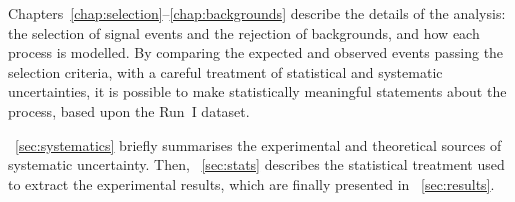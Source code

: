 
Chapters~\ref{chap:selection}--\ref{chap:backgrounds} describe the details of the \HWW 
analysis: the selection of signal events and the rejection of backgrounds, and how each 
process is modelled. By comparing the expected and observed events passing the 
selection criteria, with a careful treatment of statistical and systematic uncertainties, it 
is possible to make statistically meaningful statements about the \HWW process, based upon 
the Run~I dataset.

\Section~\ref{sec:systematics} briefly summarises the experimental and theoretical sources 
of systematic uncertainty. Then, \Section~\ref{sec:stats} describes the statistical 
treatment used to extract the experimental results, which are finally presented in  
\Section~\ref{sec:results}.
